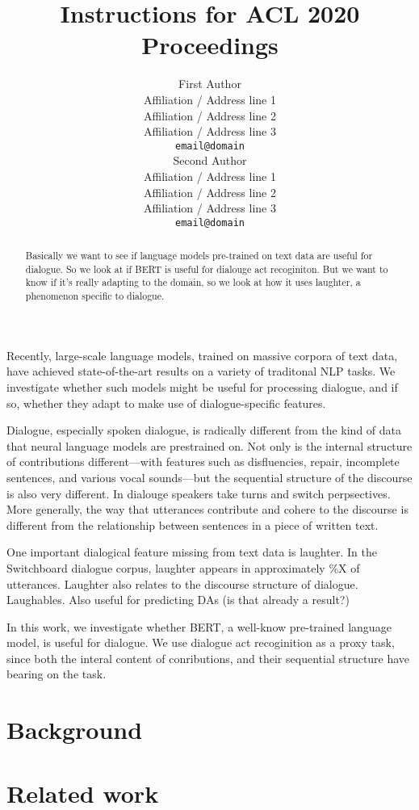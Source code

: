 \documentclass[11pt,a4paper]{article}
\title{Instructions for ACL 2020 Proceedings}
\author{First Author \\
  Affiliation / Address line 1 \\
  Affiliation / Address line 2 \\
  Affiliation / Address line 3 \\
  \texttt{email@domain} \\\And
  Second Author \\
  Affiliation / Address line 1 \\
  Affiliation / Address line 2 \\
  Affiliation / Address line 3 \\
  \texttt{email@domain} \\}
\date{}
\begin{document}
\maketitle
\begin{abstract}
  Basically we want to see if language models pre-trained on text data are useful for dialogue.
  So we look at if BERT is useful for dialouge act recoginiton.
  But we want to know if it's really adapting to the domain, so we look at how it uses laughter, a phenomenon specific to dialogue.
\end{abstract}


Recently, large-scale language models, trained on massive corpora of text data, have achieved state-of-the-art results on a variety of traditonal NLP tasks.
We investigate whether such models might be useful for processing dialogue, and if so, whether they adapt to make use of dialogue-specific features.

Dialogue, especially spoken dialogue, is radically different from the kind of data that neural language models are prestrained on.
Not only is the internal structure of contributions different---with features such as disfluencies, repair, incomplete sentences, and various vocal sounds---but the sequential structure of the discourse is also very different.
In dialouge speakers take turns and switch perpsectives.
More generally, the way that utterances contribute and cohere to the discourse is different from the relationship between sentences in a piece of written text.

One important dialogical feature missing from text data is laughter.
In the Switchboard dialogue corpus, laughter appears in approximately \%X of utterances.
Laughter also relates to the discourse structure of dialogue. 
Laughables.
Also useful for predicting DAs (is that already a result?)

In this work, we investigate whether BERT, a well-know pre-trained language model, is useful for dialogue.
We use dialogue act recoginition as a proxy task, since both the interal content of conributions, and their sequential structure have bearing on the task.

\section{Background} %

\section{Related work} %
\end{document}
